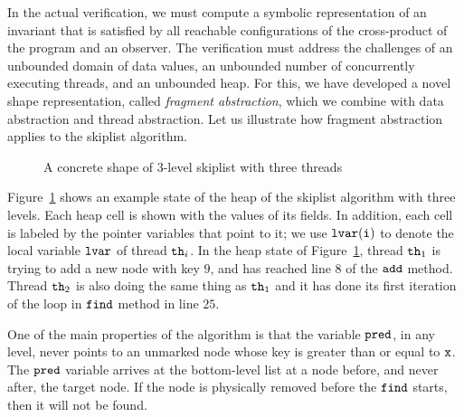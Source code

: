 In the actual verification, we must compute a symbolic representation
of an invariant that is satisfied by all reachable configurations of
the cross-product of the program  and an observer.
The verification must address the challenges of an unbounded domain of
data values, an unbounded number of concurrently executing threads, and an
unbounded heap.
For this, we have developed a novel shape representation, called
{\em fragment abstraction}, which we combine with
data abstraction and thread abstraction.
Let us illustrate how fragment abstraction applies to the skiplist
algorithm.
\begin{figure}
\center  
   
 \caption{A concrete shape of 3-level skiplist with three threads}
\label{sl-shape}
\end{figure}


Figure~\ref{sl-shape} shows an example state of the heap of the
skiplist algorithm with three levels. Each heap cell is shown with the values of its fields. 
In addition, each cell is labeled by the
pointer variables that point to it; we use ${\tt lvar(i)}$ to denote the local
variable ${\tt lvar}$ of thread ${\tt th}_i$.
In the heap state of Figure~\ref{sl-shape}, thread ${\tt th}_1$ is trying to add a new node with key $9$, and has reached line $8$ of the $\tt add$ method.  Thread ${\tt th}_2$ is also doing the same thing as ${\tt th}_1$ and it has done its first iteration of the loop in $\tt find$ method in line $25$.

One of the main properties of the algorithm is that 
the variable $\tt pred$, in any level, never points to an unmarked node whose key is greater than or equal to $\tt x$. The $\tt pred$ variable arrives at the bottom-level list at a node before, and never after, the target node. If the node is physically removed before the $\tt find$ starts, then it will not be found.

